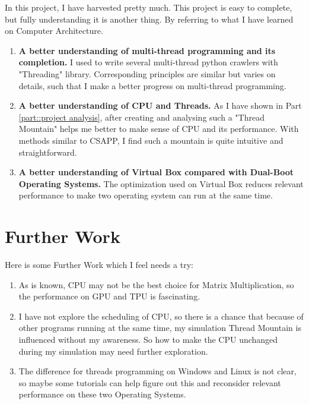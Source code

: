 \documentclass[12pt,a4paper]{article}
\begin{document}
In this project, I have harvested pretty much. This project is easy to complete, but fully understanding it is another thing. By referring to what I have learned on Computer Architecture.
\begin{enumerate}
	\item \textbf{A better understanding of multi-thread programming and its completion.} I used to write several multi-thread python crawlers with "Threading" library. Corresponding principles are similar but varies on details, such that I make a better progress on multi-thread programming.
	\item \textbf{A better understanding of CPU and Threads.} As I have shown in Part \ref{part::project analysis}, after creating and analysing such a "Thread Mountain" helps me better to make sense of CPU and its performance. With methods similar to CSAPP, I find such a mountain is quite intuitive and straightforward.
	\item \textbf{A better understanding of Virtual Box compared with Dual-Boot Operating Systems.} The optimization used on Virtual Box reduces relevant performance to make two operating system can run at the same time.
\end{enumerate}

\section{Further Work}
Here is some Further Work which I feel needs a try:
\begin{enumerate}
	\item As is known, CPU may not be the best choice for Matrix Multiplication, so the performance on GPU and TPU is fascinating.
	\item I have not explore the scheduling of CPU, so there is a chance that because of other programs running at the same time, my simulation Thread Mountain is influenced without my awareness. So how to make the CPU unchanged during my simulation may need further exploration.
	\item The difference for threads programming on Windows and Linux is not clear, so maybe some tutorials can help figure out this and reconsider relevant performance on these two Operating Systems.
\end{enumerate}




\end{document}
